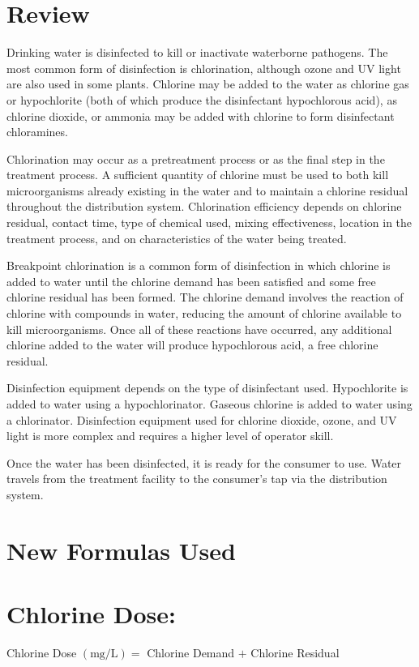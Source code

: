 \documentclass[10pt]{article}
\begin{document}
\section{Review}
Drinking water is disinfected to kill or inactivate waterborne pathogens. The most common form of disinfection is chlorination, although ozone and UV light are also used in some plants. Chlorine may be added to the water as chlorine gas or hypochlorite (both of which produce the disinfectant hypochlorous acid), as chlorine dioxide, or ammonia may be added with chlorine to form disinfectant chloramines.

Chlorination may occur as a pretreatment process or as the final step in the treatment process. A sufficient quantity of chlorine must be used to both kill microorganisms already existing in the water and to maintain a chlorine residual throughout the distribution system. Chlorination efficiency depends on chlorine residual, contact time, type of chemical used, mixing effectiveness, location in the treatment process, and on characteristics of the water being treated.

Breakpoint chlorination is a common form of disinfection in which chlorine is added to water until the chlorine demand has been satisfied and some free chlorine residual has been formed. The chlorine demand involves the reaction of chlorine with compounds in water, reducing the amount of chlorine available to kill microorganisms. Once all of these reactions have occurred, any additional chlorine added to the water will produce hypochlorous acid, a free chlorine residual.

Disinfection equipment depends on the type of disinfectant used. Hypochlorite is added to water using a hypochlorinator. Gaseous chlorine is added to water using a chlorinator. Disinfection equipment used for chlorine dioxide, ozone, and UV light is more complex and requires a higher level of operator skill.

Once the water has been disinfected, it is ready for the consumer to use. Water travels from the treatment facility to the consumer's tap via the distribution system.

\section{New Formulas Used}
\section{Chlorine Dose:}
Chlorine Dose $(\mathrm{mg} / \mathrm{L})=$ Chlorine Demand $+$ Chlorine Residual
\end{document}

